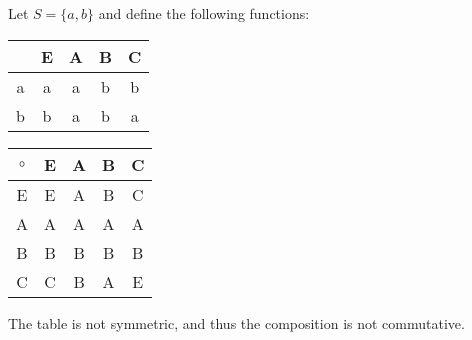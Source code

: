 \documentclass[letterpaper,12pt,fleqn]{article}
\begin{document}
\begin{example}
  Let $S=\{a,b\}$ and define the following functions:

  \begin{tabular}{c|c|c|c|c}
      & E & A & B & C \\
    \hline
    a & a & a & b & b \\
    b & b & a & b & a \\
  \end{tabular}

  \bigskip

  \begin{tabular}{c|cccc}
    $\circ$ & E & A & B & C \\
    \hline
    E & E & A & B & C \\
    A & A & A & A & A \\
    B & B & B & B & B \\
    C & C & B & A & E \\
  \end{tabular}

  \bigskip

  The table is not symmetric, and thus the composition is not commutative.
\end{example}
\end{document}
